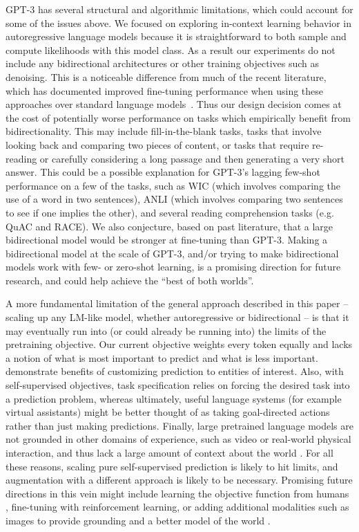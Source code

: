 GPT-3 has several structural and algorithmic limitations, which could account for some of the issues above. We focused on exploring in-context learning behavior in autoregressive language models because it is straightforward to both sample and compute likelihoods with this model class. As a result our experiments do not include any bidirectional architectures or other training objectives such as denoising. This is a noticeable difference from much of the recent literature, which has documented improved fine-tuning performance when using these approaches over standard language models~\cite{raffel2019t5}. Thus our design decision comes at the cost of potentially worse performance on tasks which empirically benefit from bidirectionality. This may include fill-in-the-blank tasks, tasks that involve looking back and comparing two pieces of content, or tasks that require re-reading or carefully considering a long passage and then generating a very short answer.  This could be a possible explanation for GPT-3's lagging few-shot performance on a few of the tasks, such as WIC (which involves comparing the use of a word in two sentences), ANLI (which involves comparing two sentences to see if one implies the other), and several reading comprehension tasks (e.g. QuAC and RACE).  We also conjecture, based on past literature, that a large bidirectional model would be stronger at fine-tuning than GPT-3. Making a bidirectional model at the scale of GPT-3, and/or trying to make bidirectional models work with few- or zero-shot learning, is a promising direction for future research, and could help achieve the ``best of both worlds''.

A more fundamental limitation of the general approach described in this paper -- scaling up any LM-like model, whether autoregressive or bidirectional -- is that it may eventually run into (or could already be running into) the limits of the pretraining objective. Our current objective weights every token equally and lacks a notion of what is most important to predict and what is less important. \cite{roberts2020much} demonstrate benefits of customizing prediction to entities of interest. Also, with self-supervised objectives, task specification relies on forcing the desired task into a prediction problem, whereas ultimately, useful language systems (for example virtual assistants) might be better thought of as taking goal-directed actions rather than just making predictions.  Finally, large pretrained language models are not grounded in other domains of experience, such as video or real-world physical interaction, and thus lack a large amount of context about the world \cite{bisk2020experience}.  For all these reasons, scaling pure self-supervised prediction is likely to hit limits, and augmentation with a different approach is likely to be necessary.  Promising future directions in this vein might include learning the objective function from humans \cite{ziegler2019finetuning}, fine-tuning with reinforcement learning, or adding additional modalities such as images to provide grounding and a better model of the world \cite{chen2019uniter}.

